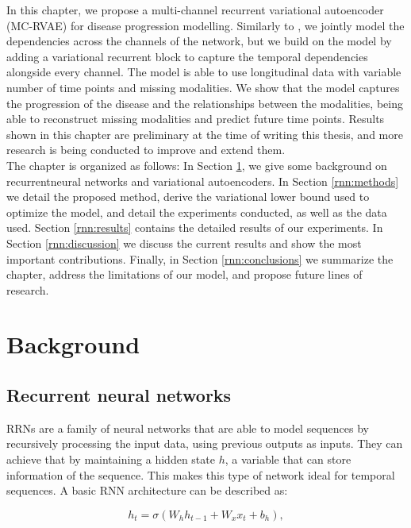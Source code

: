 In this chapter, we propose a multi-channel recurrent variational autoencoder  (MC-RVAE) for disease progression modelling. Similarly to \cite{Antelmi2019}, we jointly model the dependencies across the channels of the network, but we build on the model by adding a variational recurrent block to capture the temporal dependencies alongside every channel. The model is able to use longitudinal data with variable number of time points and missing modalities. We show that the model captures the progression of the disease and the relationships between the modalities, being able to reconstruct missing modalities and predict future time points. Results shown in this chapter are preliminary at the time of writing this thesis, and more research is being conducted to improve and extend them. \\

The chapter is organized as follows: In Section \ref{rnn:background}, we give some background on recurrentneural networks and variational autoencoders. In Section \ref{rnn:methods} we detail the proposed method, derive the variational lower bound used to optimize the model, and detail the experiments conducted, as well as the data used. Section \ref{rnn:results} contains the detailed results of our experiments. In Section \ref{rnn:discussion} we discuss the current results and show the most important contributions. Finally, in Section \ref{rnn:conclusions} we summarize the chapter, address the limitations of our model, and propose future lines of research.

\section{Background}
\label{rnn:background}

\subsection{Recurrent neural networks}

RRNs are a family of neural networks that are able to model sequences by recursively processing the input data, using previous outputs as inputs. They can achieve that by maintaining a hidden state $h$, a variable that can store information of the sequence. This makes this type of network ideal for temporal sequences. A basic RNN architecture can be described as:

\begin{equation}
    h_t = \mathit{\sigma}(W_h h_{t-1} + W_x x_{t} + b_h),
\end{equation}

